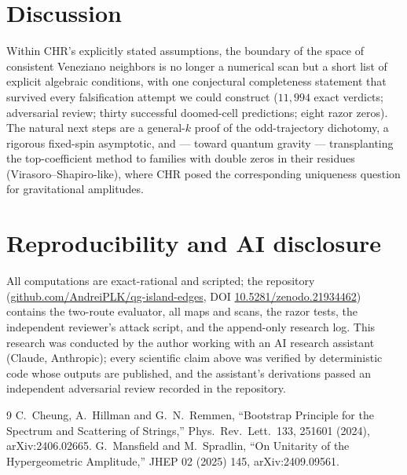 \documentclass[11pt]{article}
\begin{document}
\section{Discussion}

Within CHR's explicitly stated assumptions, the boundary of the space of
consistent Veneziano neighbors is no longer a numerical scan but a short list
of explicit algebraic conditions, with one conjectural completeness statement
that survived every falsification attempt we could construct
($11{,}994$ exact verdicts; adversarial review; thirty successful
doomed-cell predictions; eight razor zeros). The natural next steps are a
general-$k$ proof of the odd-trajectory dichotomy, a rigorous fixed-spin
asymptotic, and --- toward quantum gravity --- transplanting the
top-coefficient method to families with double zeros in their residues
(Virasoro--Shapiro-like), where CHR posed the corresponding uniqueness
question for gravitational amplitudes.

\section*{Reproducibility and AI disclosure}

All computations are exact-rational and scripted; the repository
(\href{https://github.com/AndreiPLK/qg-island-edges}{github.com/AndreiPLK/qg-island-edges},
DOI \href{https://doi.org/10.5281/zenodo.21934462}{10.5281/zenodo.21934462}) contains the
two-route evaluator, all maps and scans, the razor tests, the independent
reviewer's attack script, and the append-only research log. This research was
conducted by the author working with an AI research assistant (Claude,
Anthropic); every scientific claim above was verified by deterministic code
whose outputs are published, and the assistant's derivations passed an
independent adversarial review recorded in the repository.

\begin{thebibliography}{9}
 C.~Cheung, A.~Hillman and G.~N.~Remmen,
``Bootstrap Principle for the Spectrum and Scattering of Strings,''
Phys.\ Rev.\ Lett.\ 133, 251601 (2024), arXiv:2406.02665.
 G.~Mansfield and M.~Spradlin,
``On Unitarity of the Hypergeometric Amplitude,''
JHEP 02 (2025) 145, arXiv:2409.09561.
\end{thebibliography}
\end{document}
